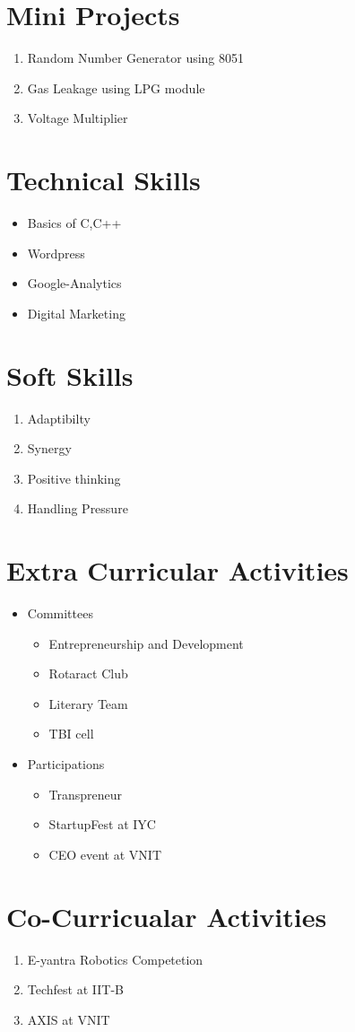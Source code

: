 \documentclass{article}
\begin{document}
\section{Mini Projects}
\begin{enumerate}
	\item Random Number Generator using 8051
	\item Gas Leakage using LPG module
	\item Voltage Multiplier
\end{enumerate}
\section{Technical Skills}
\begin{itemize}
	\item Basics of C,C++
	\item Wordpress
	\item Google-Analytics
	\item Digital Marketing
\end{itemize}
\section{Soft Skills}
\begin{enumerate}
	\item Adaptibilty
	\item Synergy
	\item Positive thinking
	\item Handling Pressure
\end{enumerate}
\section{Extra Curricular Activities}
\begin{itemize}
	\item{ Committees
		\begin{itemize}
			\item Entrepreneurship and Development
			\item Rotaract Club
			\item Literary Team
			\item TBI cell
	\end{itemize}}
	\item { Participations
		\begin{itemize}
			\item Transpreneur
			\item StartupFest at IYC
			\item CEO event at VNIT
	\end{itemize}}
\end{itemize}
\section{Co-Curricualar Activities}
\begin{enumerate}
	\item E-yantra Robotics Competetion
	\item Techfest at IIT-B
	\item AXIS at VNIT
\end{enumerate}
\end{document}
